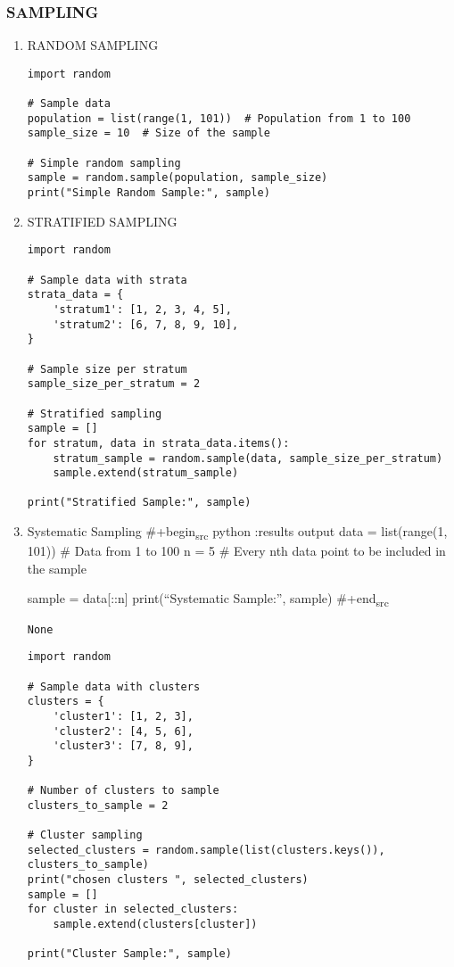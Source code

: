 \documentclass[11pt]{article}
\begin{document}
\subsubsection{SAMPLING}
\label{sec:org4ac245d}
\begin{enumerate}
\item RANDOM SAMPLING
\label{sec:org0474dd5}
\begin{verbatim}
import random

# Sample data
population = list(range(1, 101))  # Population from 1 to 100
sample_size = 10  # Size of the sample

# Simple random sampling
sample = random.sample(population, sample_size)
print("Simple Random Sample:", sample)
\end{verbatim}
\item STRATIFIED SAMPLING
\label{sec:org9fcd046}
\begin{verbatim}
import random

# Sample data with strata
strata_data = {
    'stratum1': [1, 2, 3, 4, 5],
    'stratum2': [6, 7, 8, 9, 10],
}

# Sample size per stratum
sample_size_per_stratum = 2

# Stratified sampling
sample = []
for stratum, data in strata_data.items():
    stratum_sample = random.sample(data, sample_size_per_stratum)
    sample.extend(stratum_sample)

print("Stratified Sample:", sample)
\end{verbatim}
\item Systematic Sampling \#+begin\textsubscript{src} python :results output
\label{sec:org5aaf8bf}
data = list(range(1, 101))  \# Data from 1 to 100
n = 5  \# Every nth data point to be included in the sample

sample = data[::n]
print(``Systematic Sample:'', sample)
\#+end\textsubscript{src}

\label{}
\begin{verbatim}
None
\end{verbatim}



\begin{verbatim}
import random

# Sample data with clusters
clusters = {
    'cluster1': [1, 2, 3],
    'cluster2': [4, 5, 6],
    'cluster3': [7, 8, 9],
}

# Number of clusters to sample
clusters_to_sample = 2

# Cluster sampling
selected_clusters = random.sample(list(clusters.keys()), clusters_to_sample)
print("chosen clusters ", selected_clusters)
sample = []
for cluster in selected_clusters:
    sample.extend(clusters[cluster])

print("Cluster Sample:", sample)
\end{verbatim}
\end{enumerate}
\end{document}
